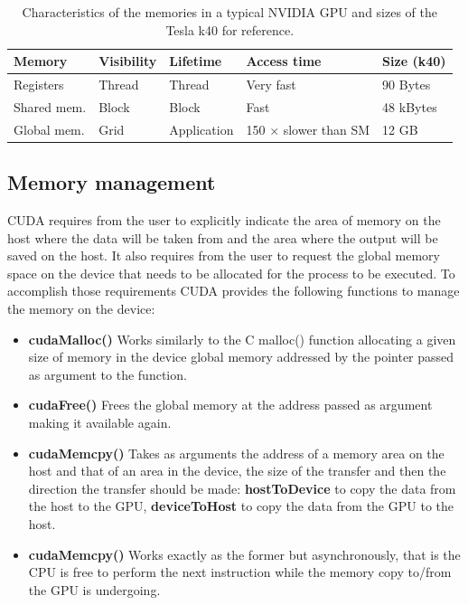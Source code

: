 \begin{center}
\begin{table}[h]
\begin{tabular}{ l | l | l | l | l}
\textbf{Memory} & \textbf{Visibility} & \textbf{Lifetime} & \textbf{Access time} & \textbf{Size (k40)}\\
\hline
Registers & Thread & Thread & Very fast & 90 Bytes \\
Shared mem. & Block & Block & Fast & 48 kBytes \\
Global mem. & Grid & Application & 150 $\times$ slower than SM & 12 GB \\
\end{tabular}
\caption{Characteristics of the memories in a typical NVIDIA GPU and sizes of the Tesla k40 for reference.}
\label{tabMemory}
\end{table}
\end{center}

\subsection{Memory management}
CUDA requires from the user to explicitly indicate the area of memory on the host where the data will be taken from and the area where the output will be saved on the host.
It also requires from the user to request the global memory space on the device that needs to be allocated for the process to be executed.
To accomplish those requirements CUDA provides the following functions to manage the memory on the device:
\begin{itemize}
\item \textbf{cudaMalloc()} Works similarly to the C malloc() function allocating a given size of memory in the device global memory addressed by the pointer passed as argument to the function.
\item \textbf{cudaFree()} Frees the global memory at the address passed as argument making it available again.
\item \textbf{cudaMemcpy()} Takes as arguments the address of a memory area on the host and that of an area in the device, the size of the transfer and then the direction the transfer should be made: \textbf{hostToDevice} to copy the data from the host to the GPU, \textbf{deviceToHost} to copy the data from the GPU to the host.
\item \textbf{cudaMemcpy()} Works exactly as the former but asynchronously, that is the CPU is free to perform the next instruction while the memory copy to/from the GPU is undergoing.
\end{itemize}

